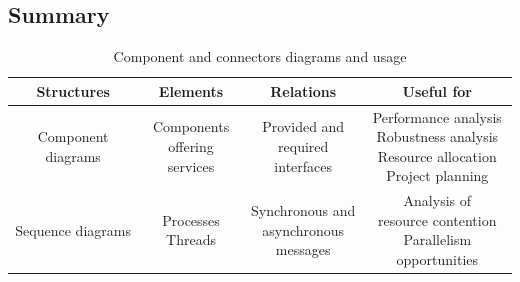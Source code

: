 \subsection*{Summary}
\begin{table}[H]
    \centering
    \begin{tabular}{|c|ccc|}
    \hline
    \textbf{Structures}    & \textbf{Elements}                              & \textbf{Relations}                                                    & \textbf{Useful for}                                                                           \\ \hline
    Component diagrams     & \makecell{Components\\offering services}       & \makecell{Provided and\\required interfaces}                          & \makecell{Performance analysis\\Robustness analysis\\Resource allocation\\Project planning}   \\ \hline
    Sequence diagrams      & \makecell{Processes\\Threads}                  & \makecell{Synchronous and\\asynchronous\\messages}                     & \makecell{Analysis of\\resource contention\\Parallelism opportunities}                         \\ \hline
    \end{tabular}
    \caption{Component and connectors diagrams and usage}
\end{table}
